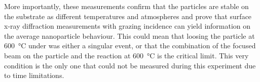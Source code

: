 More importantly, these measurements confirm that the particles are stable on the substrate as different temperatures and atmospheres and prove that surface x-ray diffraction measurements with grazing incidence can yield information on the average nanoparticle behaviour.
This could mean that loosing the particle at \qty{600}{\degreeCelsius} under \ammonia was either a singular event, or that the combination of the focused beam on the particle and the reaction at \qty{600}{\degreeCelsius} is the critical limit.
This very condition is the only one that could not be measured during this experiment due to time limitations.
